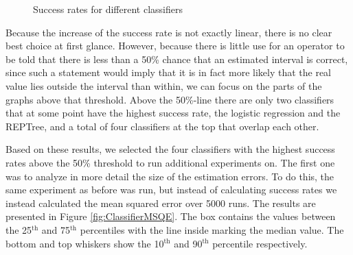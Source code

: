 \documentclass{sig-alternate}
\newcommand{\superscript}[1]{\ensuremath{^{\textrm{#1}}}}
\begin{document}
\begin{figure}[htpb]
\begin{center}

	\caption{Success rates for different classifiers}
	\label{fig:ClassifierComparison}
\end{center}
\end{figure}

Because the increase of the success rate is not exactly linear, there is no clear best choice at first glance. However, because there is little use for an operator to be told that there is less than a 50\% chance that an estimated interval is correct, since such a statement would imply that it is in fact more likely that the real value lies outside the interval than within, we can focus on the parts of the graphs above that threshold. Above the 50\%-line there are only two classifiers that at some point have the highest success rate, the logistic regression and the REPTree, and a total of four classifiers at the top that overlap each other.

Based on these results, we selected the four classifiers with the highest success rates above the 50\% threshold to run additional experiments on. The first one was to analyze in more detail the size of the estimation errors. To do this, the same experiment as before was run, but instead of calculating success rates we instead calculated the mean squared error over 5000 runs. The results are presented in Figure \ref{fig:ClassifierMSQE}. The box contains the values between the 25\superscript{th} and 75\superscript{th} percentiles with the line inside marking the median value. The bottom and top whiskers show the 10\superscript{th} and 90\superscript{th} percentile respectively.
\end{document}
